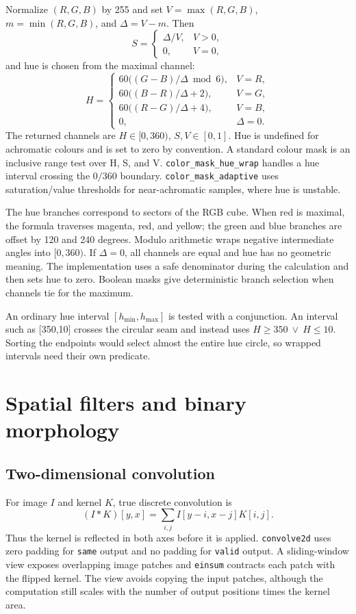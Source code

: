 \documentclass[11pt,a4paper]{article}
\newcommand{\1}{\mathbf{1}}
\begin{document}
Normalize $(R,G,B)$ by 255 and set $V=\max(R,G,B)$,
$m=\min(R,G,B)$, and $\Delta=V-m$. Then
\[
 S=\begin{cases}\Delta/V,&V>0,\\0,&V=0,\end{cases}
\]
and hue is chosen from the maximal channel:
\[
H=\begin{cases}
60\bigl((G-B)/\Delta\bmod 6\bigr),&V=R,\\
60\bigl((B-R)/\Delta+2\bigr),&V=G,\\
60\bigl((R-G)/\Delta+4\bigr),&V=B,\\
0,&\Delta=0.
\end{cases}
\]
The returned channels are $H\in[0,360)$, $S,V\in[0,1]$. Hue is undefined
for achromatic colours and is set to zero by convention. A standard colour mask
is an inclusive range test over H, S, and V. \texttt{color\_mask\_hue\_wrap} handles a
hue interval crossing the $0/360$ boundary. \texttt{color\_mask\_adaptive} uses
saturation/value thresholds for near-achromatic samples, where hue is unstable.

The hue branches correspond to sectors of the RGB cube. When red is maximal,
the formula traverses magenta, red, and yellow; the green and blue branches are
offset by 120 and 240 degrees. Modulo arithmetic wraps negative intermediate
angles into $[0,360)$. If $\Delta=0$, all channels are equal and hue has no
geometric meaning. The implementation uses a safe denominator during the
calculation and then sets hue to zero. Boolean masks give deterministic branch
selection when channels tie for the maximum.

An ordinary hue interval $[h_{\min},h_{\max}]$ is tested with a conjunction.
An interval such as [350,10] crosses the circular seam and instead uses
$H\ge350\ \lor\ H\le10$. Sorting the endpoints would select almost the entire
hue circle, so wrapped intervals need their own predicate.

\section{Spatial filters and binary morphology}

\subsection{Two-dimensional convolution}

For image $I$ and kernel $K$, true discrete convolution is
\[
  (I*K)[y,x]=\sum_{i,j}I[y-i,x-j]K[i,j].
\]
Thus the kernel is reflected in both axes before it is applied. \texttt{convolve2d}
uses zero padding for \texttt{same} output and no padding for \texttt{valid} output. A
sliding-window view exposes overlapping image patches and \texttt{einsum} contracts
each patch with the flipped kernel. The view avoids copying the input patches,
although the computation still scales with the number of output positions times
the kernel area.
\end{document}
